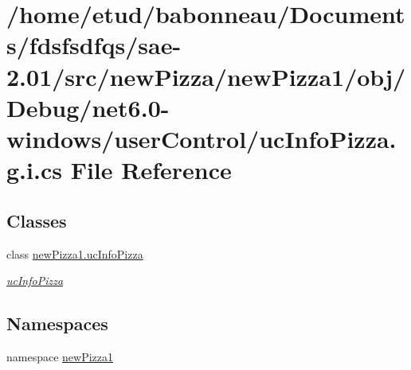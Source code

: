 \hypertarget{net6_80-windows_2userControl_2ucInfoPizza_8g_8i_8cs}{}\section{/home/etud/babonneau/\+Documents/fdsfsdfqs/sae-\/2.01/src/new\+Pizza/new\+Pizza1/obj/\+Debug/net6.0-\/windows/user\+Control/uc\+Info\+Pizza.g.\+i.\+cs File Reference}
\label{net6_80-windows_2userControl_2ucInfoPizza_8g_8i_8cs}
\subsection*{Classes}
\begin{DoxyCompactItemize}
\item 
class \hyperlink{classnewPizza1_1_1ucInfoPizza}{new\+Pizza1.\+uc\+Info\+Pizza}
\begin{DoxyCompactList}\small\item\em \hyperlink{classnewPizza1_1_1ucInfoPizza}{uc\+Info\+Pizza} \end{DoxyCompactList}\end{DoxyCompactItemize}
\subsection*{Namespaces}
\begin{DoxyCompactItemize}
\item 
namespace \hyperlink{namespacenewPizza1}{new\+Pizza1}
\end{DoxyCompactItemize}
